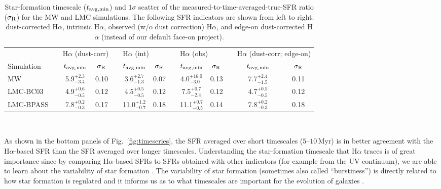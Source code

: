 \documentclass[fleqn,usenatbib]{mnras}
\begin{document}
\begin{table*}
    \setlength{\tabcolsep}{5pt}
    \renewcommand{\arraystretch}{1.5}
    \caption{Star-formation timescale ($t_{\rm avg, min}$) and $1\sigma$ scatter of the measured-to-time-averaged-true-SFR ratio ($\sigma_{\rm R}$) for the MW and LMC simulations. The following SFR indicators are shown from left to right: dust-corrected H$\alpha$, intrinsic H$\alpha$, observed (w/o dust correction) H$\alpha$, and edge-on dust-corrected H$\alpha$ (instead of our default face-on project).}\label{tab:tavg}
    \centering
        \begin{tabular}{llcclcclcclcc}
          & & \multicolumn{2}{l}{H$\alpha$ (dust-corr)} & & \multicolumn{2}{l}{H$\alpha$ (int)} & & \multicolumn{2}{l}{H$\alpha$ (obs)} & & \multicolumn{2}{l}{H$\alpha$ (dust-corr; edge-on)}  \\
          \cline{3-4} \cline{6-7} \cline{9-10} \cline{12-13} 
          Simulation & & $t_{\rm avg, min}$ & $\sigma_{\rm R}$ & & $t_{\rm avg, min}$ & $\sigma_{\rm R}$ & & $t_{\rm avg, min}$ & $\sigma_{\rm R}$ & & $t_{\rm avg, min}$ & $\sigma_{\rm R}$ \\ 
          \cline{1-1} \cline{3-4} \cline{6-7} \cline{9-10} \cline{12-13} 
          MW & & 5.9$_{-3.4}^{+2.3}$ & 0.10 & & 3.6$_{-1.3}^{+2.7}$ & 0.07 & & 4.0$_{-3.0}^{+16.0}$ & 0.13 & & 7.7$_{-1.5}^{+2.4}$ & 0.11 \\
          LMC-BC03 & & 4.9$_{-0.5}^{+0.6}$ & 0.12 & & 4.5$_{-0.5}^{+0.5}$ & 0.12 & & 7.5$_{-2.4}^{+0.7}$ & 0.12 & & 4.7$_{-0.5}^{+0.5}$ & 0.12 \\
          LMC-BPASS & & 7.8$_{-0.3}^{+0.2}$ & 0.17 & & 11.0$_{-0.7}^{+1.2}$ & 0.18 & & 11.1$_{-0.5}^{+0.7}$ & 0.14 & & 7.8$_{-0.3}^{+0.2}$ & 0.18 \\  \hline
        \end{tabular}\\
\end{table*}


As shown in the bottom panels of Fig.~\ref{fig:timeseries}, the SFR averaged over short timescales ($5$--$10$\,Myr) is in better agreement with the H$\alpha$-based SFR than the SFR averaged over longer timescales. Understanding the star-formation timescale that H$\alpha$ traces is of great importance since by comparing H$\alpha$-based SFRs to SFRs obtained with other indicators (for example from the UV continuum), we are able to learn about the variability of star formation \citep[e.g.,][]{sparre17_bursty, caplar19, emami19}. The variability of star formation (sometimes also called ``burstiness'') is directly related to how star formation is regulated and it informs us as to what timescales are important for the evolution of galaxies \citep{iyer20, tacchella20, wang20_p1}.
\end{document}
